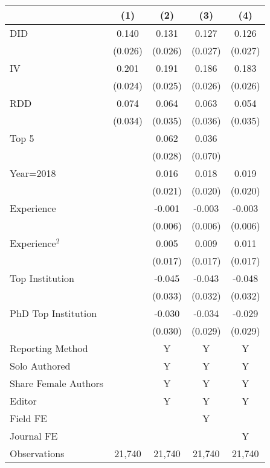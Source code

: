 \begin{tabular}{l*{4}{c}}
\hline\hline
                &\multicolumn{1}{c}{(1)}&\multicolumn{1}{c}{(2)}&\multicolumn{1}{c}{(3)}&\multicolumn{1}{c}{(4)}\\
\hline
DID             &    0.140&    0.131&    0.127&    0.126\\
                &  (0.026)&  (0.026)&  (0.027)&  (0.027)\\
IV              &    0.201&    0.191&    0.186&    0.183\\
                &  (0.024)&  (0.025)&  (0.026)&  (0.026)\\
RDD             &    0.074&    0.064&    0.063&    0.054\\
                &  (0.034)&  (0.035)&  (0.036)&  (0.035)\\
Top 5           &         &    0.062&    0.036&         \\
                &         &  (0.028)&  (0.070)&         \\
Year=2018       &         &    0.016&    0.018&    0.019\\
                &         &  (0.021)&  (0.020)&  (0.020)\\
Experience      &         &   -0.001&   -0.003&   -0.003\\
                &         &  (0.006)&  (0.006)&  (0.006)\\
Experience$^2$  &         &    0.005&    0.009&    0.011\\
                &         &  (0.017)&  (0.017)&  (0.017)\\
Top Institution &         &   -0.045&   -0.043&   -0.048\\
                &         &  (0.033)&  (0.032)&  (0.032)\\
PhD Top Institution&         &   -0.030&   -0.034&   -0.029\\
                &         &  (0.030)&  (0.029)&  (0.029)\\
Reporting Method &         &        Y&        Y&        Y\\
Solo Authored   &         &        Y&        Y&        Y\\
Share Female Authors &         &        Y&        Y&        Y\\
Editor          &         &        Y&        Y&        Y\\
Field FE        &         &         &        Y&         \\
Journal FE      &         &         &         &        Y\\
\hline
Observations    &   21,740&   21,740&   21,740&   21,740\\
\hline\hline
\end{tabular}
